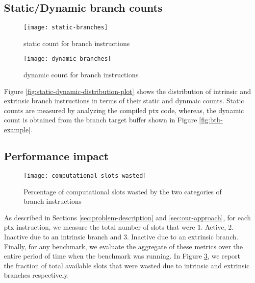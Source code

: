 %
%

\subsection{Static/Dynamic branch counts}
\begin{figure*}
	\hspace{-1.5cm}
	\centering
	\begin{subfigure}{0.45\textwidth}
		\texttt{[image: static-branches]}
		\caption{static count for branch instructions
			\label{fig:static-branches}}
	\end{subfigure}
	\begin{subfigure}{0.45\textwidth}
		\texttt{[image: dynamic-branches]}
		\caption{dynamic count for branch instructions
			\label{fig:dynamic-branches}}
	\end{subfigure}
	\caption{Distribution of the number of branches encountered in different benchmarks
		\label{fig:static-dynamic-distribution-plot}}
\end{figure*}
	Figure \ref{fig:static-dynamic-distribution-plot} shows the distribution of intrinsic and extrinsic branch instructions in terms of their static and dynmaic counts. Static counts are measured by analyzing the compiled ptx code, whereas, the dynamic count is obtained from the branch target buffer shown in Figure \ref{fig:btb-example}.

\subsection{Performance impact}
\begin{figure}
	\centering
	\texttt{[image: computational-slots-wasted]}
	\caption{Percentage of computational slots wasted by the two categories of branch instructions
		\label{fig:computational-slots-wasted}}
\end{figure}
As described in Sections \ref{sec:problem-description} and \ref{sec:our-approach}, for each ptx instruction, we measure the total number of slots that were 1. Active, 2. Inactive due to an intrinsic branch and 3. Inactive due to an extrinsic branch. Finally, for any benchmark, we evaluate the aggregate of these metrics over the entire period of time when the benchmark was running. In Figure \ref{fig:computational-slots-wasted}, we report the fraction of total available slots that were wasted due to intrinsic and extrinsic branches respectively.


